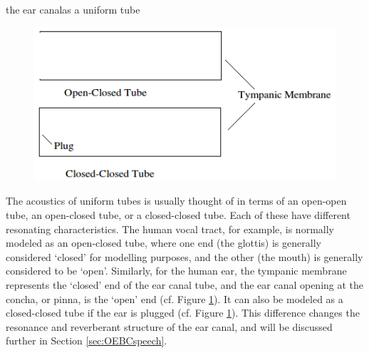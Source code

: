 \DIFdelend \DIFaddbegin {}\DIFaddend the ear canal\DIFdelbegin {}\DIFdelend \DIFaddbegin {}\DIFaddend as a uniform tube\DIFdelbegin {}\DIFdelend \DIFaddbegin {}

\begin{figure}[h!]
\centering
  \includegraphics{figure/open-closed-tube.png}
  \caption{}
  \label{fig:open-closed-tube}
\end{figure}

\DIFaddend The acoustics of uniform tubes is usually thought of in terms of an open-open tube, an open-closed tube, or a closed-closed tube.  Each of these have different resonating characteristics. The human vocal tract, for example, is normally modeled as an open-closed tube, where one end (the glottis) is generally considered `closed' for modelling purposes, and the other (the mouth) is generally considered to be `open'.  Similarly, for the human ear, the tympanic membrane represents the `closed' end of the ear canal tube, and the ear canal opening at the concha, or pinna, is the `open' end (cf. Figure \ref{fig:open-closed-tube}).  It can also be modeled as a closed-closed tube if the ear is plugged (cf. Figure \ref{fig:open-closed-tube}). This difference changes the resonance and reverberant structure of the ear canal, and will be discussed further in Section \ref{sec:OEBCspeech}.  


